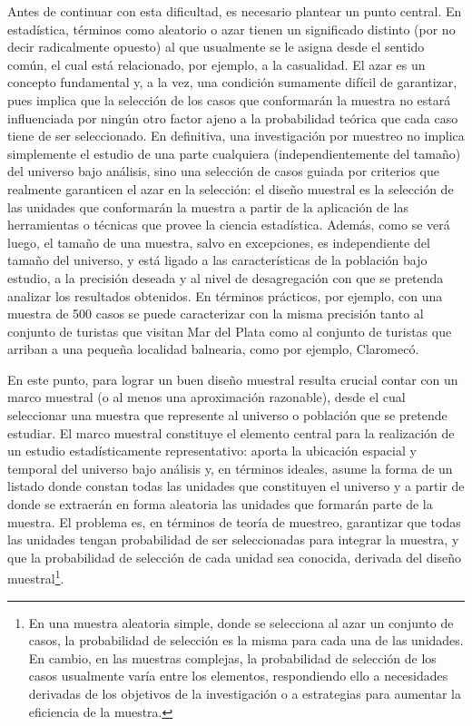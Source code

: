 \documentclass[
]{book}
\begin{document}
Antes de continuar con esta dificultad, es necesario plantear un punto central. En estadística, términos como aleatorio o azar tienen un significado distinto (por no decir radicalmente opuesto) al que usualmente se le asigna desde el sentido común, el cual está relacionado, por ejemplo, a la casualidad. El azar es un concepto fundamental y, a la vez, una condición sumamente difícil de garantizar, pues implica que la selección de los casos que conformarán la muestra no estará influenciada por ningún otro factor ajeno a la probabilidad teórica que cada caso tiene de ser seleccionado. En definitiva, una investigación por muestreo no implica simplemente el estudio de una parte cualquiera (independientemente del tamaño) del universo bajo análisis, sino una selección de casos guiada por criterios que realmente garanticen el azar en la selección: el diseño muestral es la selección de las unidades que conformarán la muestra a partir de la aplicación de las herramientas o técnicas que provee la ciencia estadística. Además, como se verá luego, el tamaño de una muestra, salvo en excepciones, es independiente del tamaño del universo, y está ligado a las características de la población bajo estudio, a la precisión deseada y al nivel de desagregación con que se pretenda analizar los resultados obtenidos. En términos prácticos, por ejemplo, con una muestra de 500 casos se puede caracterizar con la misma precisión tanto al conjunto de turistas que visitan Mar del Plata como al conjunto de turistas que arriban a una pequeña localidad balnearia, como por ejemplo, Claromecó.

En este punto, para lograr un buen diseño muestral resulta crucial contar con un marco muestral (o al menos una aproximación razonable), desde el cual seleccionar una muestra que represente al universo o población que se pretende estudiar. El marco muestral constituye el elemento central para la realización de un estudio estadísticamente representativo: aporta la ubicación espacial y temporal del universo bajo análisis y, en términos ideales, asume la forma de un listado donde constan todas las unidades que constituyen el universo y a partir de donde se extraerán en forma aleatoria las unidades que formarán parte de la muestra. El problema es, en términos de teoría de muestreo, garantizar que todas las unidades tengan probabilidad de ser seleccionadas para integrar la muestra, y que la probabilidad de selección de cada unidad sea conocida, derivada del diseño muestral\footnote{En una muestra aleatoria simple, donde se selecciona al azar un conjunto de casos, la probabilidad de selección es la misma para cada una de las unidades. En cambio, en las muestras complejas, la probabilidad de selección de los casos usualmente varía entre los elementos, respondiendo ello a necesidades derivadas de los objetivos de la investigación o a estrategias para aumentar la eficiencia de la muestra.}.
\end{document}

